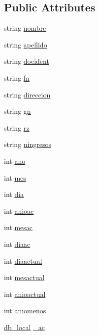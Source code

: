 \subsection*{Public Attributes}
\begin{DoxyCompactItemize}
\item 
string \hyperlink{classregpc_a95b954b79eb473167a8e631833d756ad}{nombre}
\item 
string \hyperlink{classregpc_a8b52a6da10996801ea903a96ae8123da}{apellido}
\item 
string \hyperlink{classregpc_a7b918d9a415903d63944d3ef17e48c3d}{docident}
\item 
string \hyperlink{classregpc_a0db133a320356ff6a456cee7f2d34720}{fn}
\item 
string \hyperlink{classregpc_a316ab55a02639999cc96f751997a521e}{direccion}
\item 
string \hyperlink{classregpc_ad7cee8fe68a32c50e6de8c621e3c61bc}{gn}
\item 
string \hyperlink{classregpc_a76fa61f1dbcfb75c08707c4c9cb71b43}{rz}
\item 
string \hyperlink{classregpc_a3634b2c40b40e029561728334d2a6b72}{ningresos}
\item 
int \hyperlink{classregpc_adab18fcfafb988836d4e33a4a3e840fa}{ano}
\item 
int \hyperlink{classregpc_a4b33b5752a60e0e6223d6204a9001457}{mes}
\item 
int \hyperlink{classregpc_ad83f7e1e40414037d8da89c050c239ea}{dia}
\item 
int \hyperlink{classregpc_a30dcf993ad2a2c2b4dff62753376e42f}{anioac}
\item 
int \hyperlink{classregpc_a769fa5789fc163701f43fbcd7e30dd68}{mesac}
\item 
int \hyperlink{classregpc_a69ada6ac0632885a0633c1cb8615642c}{diaac}
\item 
int \hyperlink{classregpc_a81c1c48cfc985ea5d53439bf14f6b73a}{diaactual}
\item 
int \hyperlink{classregpc_a94335c103d8a6cbe1252c99f6ca28b37}{mesactual}
\item 
int \hyperlink{classregpc_a230854b12d5c6be4af761d70580bd96d}{anioactual}
\item 
int \hyperlink{classregpc_abc23efe29a835935e3ec385a0259646e}{aniomenos}
\item 
\hyperlink{classdb__local}{db\+\_\+local} \hyperlink{classregpc_ad9477593f0a84b7cf606338133d48a48}{\+\_\+ac}
\end{DoxyCompactItemize}


